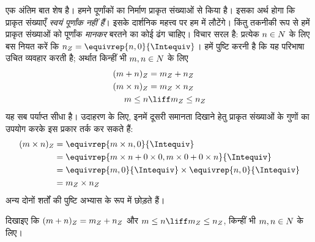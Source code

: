 \documentclass[../../../include/open-logic-section]{subfiles}
\begin{document}
एक अंतिम बात शेष है। हमने पूर्णांकों का निर्माण प्राकृत संख्याओं से किया
है। इसका अर्थ होगा कि प्राकृत संख्याएँ \emph{स्वयं पूर्णांक नहीं हैं}। इसके
दार्शनिक महत्त्व पर हम  में लौटेंगे। किंतु तकनीकी रूप से
हमें प्राकृत संख्याओं को पूर्णांक \emph{मानकर} बरतने का कोई ढंग चाहिए। विचार
सरल है: प्रत्येक $n \in N$ के लिए बस नियत करें कि
$n_\Int = \equivrep{n, 0}{\Intequiv}$। हमें पुष्टि करनी है कि यह परिभाषा
उचित व्यवहार करती है; अर्थात किन्हीं भी $m, n
\in N$ के लिए
\begin{align*}
	(m + n)_\Int &= m_\Int + n_\Int\\
	(m \times n)_\Int &= m_\Int \times n_\Int\\
	m \leq n &\liff m_\Int \leq n_\Int
\end{align*}
यह सब पर्याप्त सीधा है। उदाहरण के लिए, इनमें दूसरी समानता दिखाने हेतु
प्राकृत संख्याओं के गुणों का उपयोग करके इस प्रकार तर्क कर सकते हैं:
	\begin{align*}
		(m \times n)_\Int  &= \equivrep{m \times n, 0}{\Intequiv} \\
		&= \equivrep{m \times n + 0 \times 0, m \times 0 + 0 \times n}{\Intequiv} \\
		&= \equivrep{m, 0}{\Intequiv} \times \equivrep{n, 0}{\Intequiv} \\
		&= m_\Int \times n_\Int
	\end{align*}
अन्य दोनों शर्तों की पुष्टि अभ्यास के रूप में छोड़ते हैं।
\begin{prob}
	दिखाइए कि $(m + n)_Z = m_Z + n_Z$ और
	$m \leq n \liff m_\Int \leq n_\Int$, किन्हीं भी $m, n \in N$ के लिए।
\end{prob}
\end{document}
